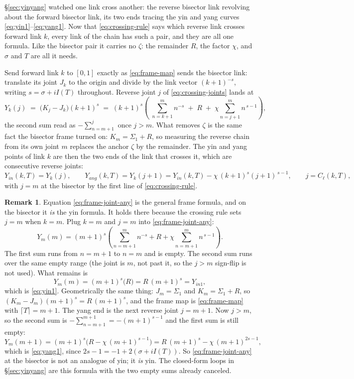 \documentclass[11pt]{article}
\theoremstyle{definition}
\newtheorem{remark}[theorem]{Remark}
\begin{document}
\S\ref{sec:yinyang} watched one link cross another: the reverse bisector link
revolving about the forward bisector link, its two ends tracing the yin and
yang curves \eqref{eq:yin1}--\eqref{eq:yang1}. Now that \eqref{eq:crossing-rule}
says which reverse link crosses forward link $k$, every link of the chain has
such a pair, and they are all one formula. Like the bisector pair it carries no
$\zeta$: the remainder $R$, the factor $\chi$, and $\sigma$ and $T$ are all it
needs.

Send forward link $k$ to $[0,1]$ exactly as \eqref{eq:frame-map} sends the
bisector link: translate its joint $J_k$ to the origin and divide by the link
vector $(k+1)^{-s}$, writing $s=\sigma+iI(T)$ throughout. Reverse joint $j$ of
\eqref{eq:crossing-joints} lands at
\begin{equation}\label{eq:frame-joint-any}
Y_k(j)\;=\;\bigl(K_j-J_k\bigr)(k+1)^{s}
\;=\;(k+1)^{s}\left(\;\sum_{n=k+1}^{m}n^{-s}\;+\;R\;+\;\chi\!\!\sum_{n=j+1}^{m}\!\!n^{\,s-1}\right),
\end{equation}
the second sum read as $-\sum_{n=m+1}^{j}$ once $j>m$. What removes $\zeta$ is
the same fact the bisector frame turned on: $K_m=\Sigma_1+R$, so measuring the
reverse chain from its own joint $m$ replaces the anchor $\zeta$ by the
remainder. The yin and yang points of link $k$ are then the two ends of the
link that crosses it, which are consecutive reverse joints:
\begin{equation}\label{eq:yin-any}
Y_{in}(k,T)=Y_k(j),
\qquad
Y_{ang}(k,T)=Y_k(j+1)=Y_{in}(k,T)-\chi\,(k+1)^{s}(j+1)^{\,s-1},
\qquad j=C_{\ell}(k,T),
\end{equation}
with $j=m$ at the bisector by the first line of \eqref{eq:crossing-rule}.

\begin{remark}
Equation \eqref{eq:frame-joint-any} is the general frame formula, and on the
bisector it \emph{is} the yin formula. It holds there because the crossing
rule sets $j=m$ when $k=m$. Plug $k=m$ and $j=m$ into
\eqref{eq:frame-joint-any}:
\[
Y_m(m)=(m+1)^{s}\left(\sum_{n=m+1}^{m}n^{-s}+R+\chi\sum_{n=m+1}^{m}n^{\,s-1}\right).
\]
The first sum runs from $n=m+1$ to $n=m$ and is empty. The second sum runs
over the same empty range (the joint is $m$, not past it, so the $j>m$
sign-flip is not used). What remains is
\[
Y_m(m)=(m+1)^{s}\bigl(R\bigr)=R\,(m+1)^{s}=Y_{in1},
\]
which is \eqref{eq:yin1}. Geometrically the same thing: $J_m=\Sigma_1$ and
$K_m=\Sigma_1+R$, so
$(K_m-J_m)(m+1)^{s}=R\,(m+1)^{s}$, and the frame map is
\eqref{eq:frame-map} with $\lceil T\rceil=m+1$. The yang end is the next
reverse joint $j=m+1$. Now $j>m$, so the second sum is
$-\sum_{n=m+1}^{m+1}=-(m+1)^{s-1}$ and the first sum is still empty:
\[
Y_m(m+1)=(m+1)^{s}\bigl(R-\chi\,(m+1)^{s-1}\bigr)
=R\,(m+1)^{s}-\chi\,(m+1)^{2s-1},
\]
which is \eqref{eq:yang1}, since $2s-1=-1+2(\sigma+iI(T))$. So
\eqref{eq:frame-joint-any} at the bisector is not an analogue of yin; it
\emph{is} yin. The closed-form loops in \S\ref{sec:yinyang} are this formula
with the two empty sums already canceled.
\end{remark}
\end{document}
